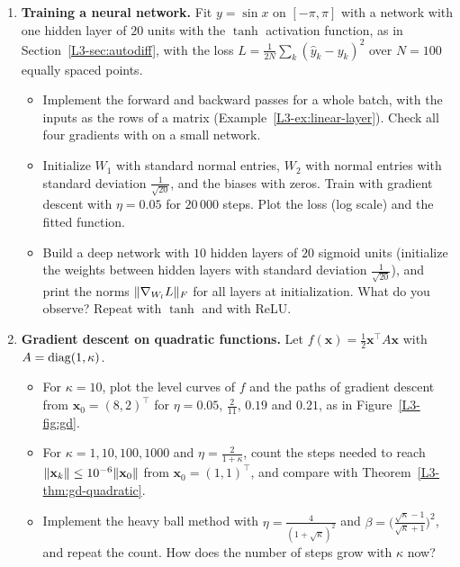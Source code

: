 \begin{enumerate}[label=\textbf{P\arabic*.}, leftmargin=*]
    \item \homework{} \textbf{Training a neural network.} Fit $y = \sin x$ on $[-\pi, \pi]$ with a network with one hidden layer of $20$ units with the $\tanh$ activation function, as in Section~\ref{L3-sec:autodiff}, with the loss $L = \frac{1}{2N}\sum_k (\hat y_k - y_k)^2$ over $N = 100$ equally spaced points.
    \begin{itemize}
        \item Implement the forward and backward passes for a whole batch, with the inputs as the rows of a matrix (Example~\ref{L3-ex:linear-layer}). Check all four gradients with  on a small network.
        \item Initialize $W_1$ with standard normal entries, $W_2$ with normal entries with standard deviation $\frac{1}{\sqrt{20}}$, and the biases with zeros. Train with gradient descent with $\eta = 0.05$ for $20\,000$ steps. Plot the loss (log scale) and the fitted function.
        \item Build a deep network with $10$ hidden layers of $20$ sigmoid units (initialize the weights between hidden layers with standard deviation $\frac{1}{\sqrt{20}}$), and print the norms $\lVert \nabla_{W_l} L \rVert_F$ for all layers at initialization. What do you observe? Repeat with $\tanh$ and with ReLU.
    \end{itemize}

    \item \homework{} \textbf{Gradient descent on quadratic functions.} Let $f(\mathbf{x}) = \frac{1}{2}\mathbf{x}^\top A\mathbf{x}$ with $A = \operatorname{diag}(1, \kappa)$.
    \begin{itemize}
        \item For $\kappa = 10$, plot the level curves of $f$ and the paths of gradient descent from $\mathbf{x}_0 = (8, 2)^\top$ for $\eta = 0.05$, $\frac{2}{11}$, $0.19$ and $0.21$, as in Figure~\ref{L3-fig:gd}.
        \item For $\kappa = 1, 10, 100, 1000$ and $\eta = \frac{2}{1 + \kappa}$, count the steps needed to reach $\lVert \mathbf{x}_k \rVert \leq 10^{-6}\lVert \mathbf{x}_0 \rVert$ from $\mathbf{x}_0 = (1, 1)^\top$, and compare with Theorem~\ref{L3-thm:gd-quadratic}.
        \item Implement the heavy ball method with $\eta = \frac{4}{(1 + \sqrt{\kappa})^2}$ and $\beta = \big(\frac{\sqrt{\kappa} - 1}{\sqrt{\kappa} + 1}\big)^2$, and repeat the count. How does the number of steps grow with $\kappa$ now?
    \end{itemize}


\end{enumerate}
